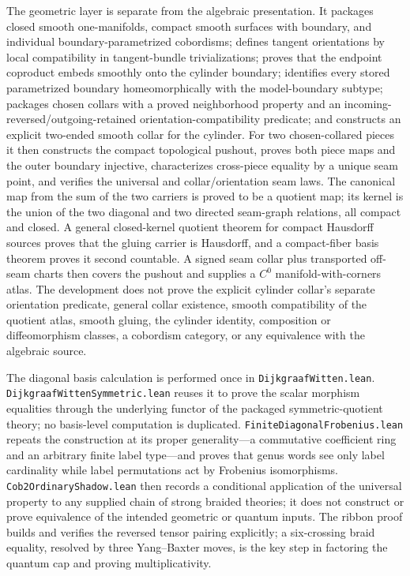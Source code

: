 \documentclass[11pt]{amsart}
\theoremstyle{plain}
\theoremstyle{definition}
\begin{document}
The geometric layer is separate from the algebraic presentation. It packages closed smooth one-manifolds, compact smooth surfaces with boundary, and individual boundary-parametrized cobordisms; defines tangent orientations by local compatibility in tangent-bundle trivializations; proves that the endpoint coproduct embeds smoothly onto the cylinder boundary; identifies every stored parametrized boundary homeomorphically with the model-boundary subtype; packages chosen collars with a proved neighborhood property and an incoming-reversed/outgoing-retained orientation-compatibility predicate; and constructs an explicit two-ended smooth collar for the cylinder. For two chosen-collared pieces it then constructs the compact topological pushout, proves both piece maps and the outer boundary injective, characterizes cross-piece equality by a unique seam point, and verifies the universal and collar/orientation seam laws. The canonical map from the sum of the two carriers is proved to be a quotient map; its kernel is the union of the two diagonal and two directed seam-graph relations, all compact and closed. A general closed-kernel quotient theorem for compact Hausdorff sources proves that the gluing carrier is Hausdorff, and a compact-fiber basis theorem proves it second countable. A signed seam collar plus transported off-seam charts then covers the pushout and supplies a $C^0$ manifold-with-corners atlas. The development does not prove the explicit cylinder collar's separate orientation predicate, general collar existence, smooth compatibility of the quotient atlas, smooth gluing, the cylinder identity, composition or diffeomorphism classes, a cobordism category, or any equivalence with the algebraic source.

The diagonal basis calculation is performed once in \texttt{DijkgraafWitten.lean}. \texttt{DijkgraafWitten}\allowbreak\texttt{Symmetric.lean} reuses it to prove the scalar morphism equalities through the underlying functor of the packaged symmetric-quotient theory; no basis-level computation is duplicated. \texttt{FiniteDiagonalFrobenius.lean} repeats the construction at its proper generality---a commutative coefficient ring and an arbitrary finite label type---and proves that genus words see only label cardinality while label permutations act by Frobenius isomorphisms. \texttt{Cob2OrdinaryShadow.lean} then records a conditional application of the universal property to any supplied chain of strong braided theories; it does not construct or prove equivalence of the intended geometric or quantum inputs. The ribbon proof builds and verifies the reversed tensor pairing explicitly; a six-crossing braid equality, resolved by three Yang--Baxter moves, is the key step in factoring the quantum cap and proving multiplicativity.
\end{document}
